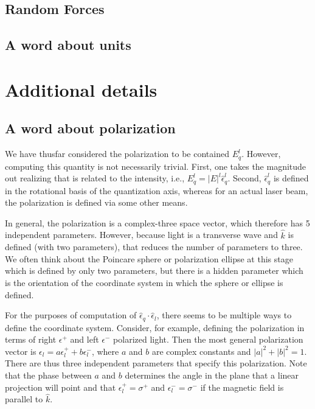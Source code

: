 \documentclass[final,5p,times,twocolumn]{elsarticle}
\begin{document}
\subsection{Random Forces}

\subsection{A word about units}

\section{Additional details}

\subsection{A word about polarization}
We have thusfar considered the polarization to be contained $E^l_q$.  However,
computing this quantity is not necessarily trivial.  First, one takes the
magnitude out realizing that is related to the intensity, i.e., $E^l_q =
|E|^l\hat{\epsilon}^l_q$.  Second, $\hat{\epsilon}^l_q$ is defined in the
rotational basis of the quantization axis, whereas for an actual laser beam,
the polarization is defined via some other means.

In general, the polarization is a complex-three space vector, which therefore
has 5 independent parameters.  However, because light is a transverse wave and
$\hat{k}$ is defined (with two parameters), that reduces the number of
parameters to three.  We often think about the Poincare sphere or polarization
ellipse at this stage which is defined by only two parameters, but there is a
hidden parameter which is the orientation of the coordinate system in which
the sphere or ellipse is defined.

For the purposes of computation of $\hat{\epsilon}_q\cdot\hat{\epsilon}_l$,
there seems to be multiple ways to define the coordinate system.  Consider, for
example, defining the polarization in terms of right $\epsilon^+$ and left
$\epsilon^-$ polarized light.  Then the most general polarization vector is
$\epsilon_l = a \epsilon^+_l + b \epsilon^-_l$, where $a$ and $b$ are complex
constants and $|a|^2+|b|^2=1$.  There are thus three independent parameters that
specify this polarization.  Note that the phase between $a$ and $b$ determines
the angle in the plane that a linear projection will point and that
$\epsilon^+_l=\sigma^+$ and $\epsilon^-_l=\sigma^-$ if the magnetic field is
parallel to $\hat{k}$.
\end{document}
